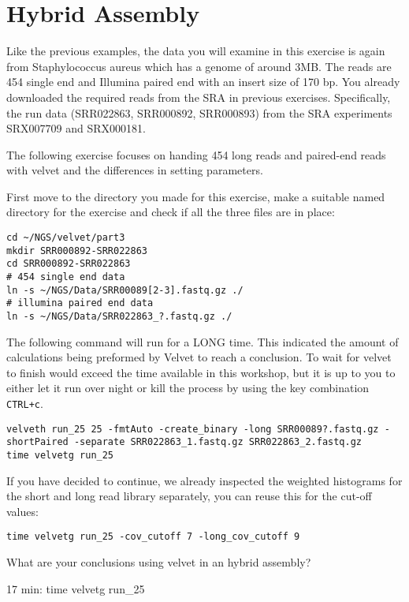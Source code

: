 \section{Hybrid Assembly}
\begin{note}
Like the previous examples, the data you will examine in this exercise is again
from Staphylococcus aureus which has a genome of around 3MB. The reads are 454
single end and Illumina paired end with an insert size of 170 bp.
You already downloaded the required reads from the SRA in previous exercises.
Specifically, the run data (SRR022863, SRR000892, SRR000893) from the SRA
experiments SRX007709 and SRX000181.
\end{note}

\begin{information}
The following exercise focuses on handing 454 long reads and paired-end reads
with velvet and the differences in setting parameters.
\end{information}

\begin{steps}
First move to the directory you made for this exercise, make a suitable named
directory for the exercise and check if all the three files are in place:
\begin{lstlisting}
cd ~/NGS/velvet/part3
mkdir SRR000892-SRR022863 
cd SRR000892-SRR022863
# 454 single end data
ln -s ~/NGS/Data/SRR00089[2-3].fastq.gz ./
# illumina paired end data
ln -s ~/NGS/Data/SRR022863_?.fastq.gz ./
\end{lstlisting}
\end{steps}

\begin{warning}
The following command will run for a LONG time. This indicated the amount of
calculations being preformed by Velvet to reach a conclusion. To wait for velvet
to finish would exceed the time available in this workshop, but it is up to you
to either let it run over night or kill the process by using the key combination
\texttt{CTRL+c}.
\begin{lstlisting}
velveth run_25 25 -fmtAuto -create_binary -long SRR00089?.fastq.gz -shortPaired -separate SRR022863_1.fastq.gz SRR022863_2.fastq.gz
time velvetg run_25
\end{lstlisting}

\begin{steps}
If you have decided to continue, we already inspected the weighted histograms
for the short and long read library separately, you can reuse this for the
cut-off values:
\begin{lstlisting}
time velvetg run_25 -cov_cutoff 7 -long_cov_cutoff 9
\end{lstlisting}
\end{steps}

\begin{questions}
What are your conclusions using velvet in an hybrid assembly?
\begin{answer}
17 min:  time velvetg run\_25
\end{answer}
\end{questions}

\end{warning}